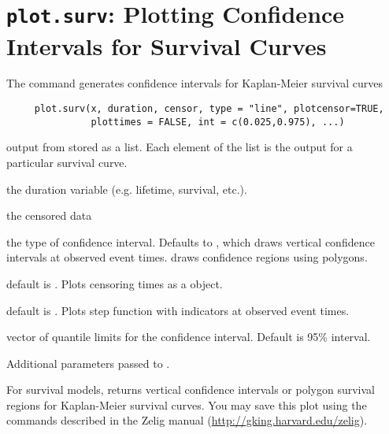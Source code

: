  \section{{\tt plot.surv}: Plotting Confidence Intervals for Survival Curves}\label{ss:plot.surv}
\begin{Description}\relax
The  command generates confidence intervals for Kaplan-Meier survival curves
\end{Description}
\begin{Usage}
\begin{verbatim}
     plot.surv(x, duration, censor, type = "line", plotcensor=TRUE,
               plottimes = FALSE, int = c(0.025,0.975), ...) 
\end{verbatim}
\end{Usage}
\begin{Arguments}
\begin{ldescription}
\item[\code{x}] output from  stored as a list.  Each element of the list is the  output for a particular survival curve.
\item[\code{duration}] the duration variable (e.g. lifetime, survival, etc.).
\item[\code{censor}] the censored data
\item[\code{type}] the type of confidence interval.  Defaults to , which draws vertical confidence intervals at observed event times.   draws confidence regions using polygons.
\item[\code{plotcensor}] default is . Plots censoring times as a  object.
\item[\code{plottimes}] default is . Plots step function with indicators at observed event times.
\item[\code{int}] vector of quantile limits for the confidence interval.  Default is 95\% interval.
\item[\code{...}] Additional parameters passed to .
\end{ldescription}
\end{Arguments}
\begin{Value}
For survival models,  returns vertical
confidence intervals or polygon survival regions for Kaplan-Meier survival curves.  You may save this plot using the commands described in the
Zelig manual (\url{http://gking.harvard.edu/zelig}).
\end{Value}
